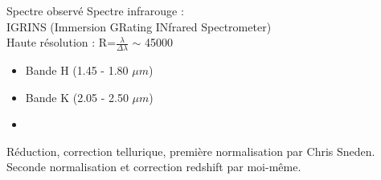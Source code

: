 \documentclass[10pt]{beamer}
\begin{document}
\begin{frame}[fragile]{Spectre observé}
             Spectre infrarouge : \\
             IGRINS (Immersion GRating INfrared Spectrometer) \\ 
             Haute résolution : R=$\frac{\lambda}{\Delta \lambda}$ $\sim$ 45000 \\
    					\begin{itemize}
    						\item Bande H (1.45 - 1.80 $\mu m$)
    						\item Bande K (2.05 - 2.50 $\mu m$)
    						\item[]
    					\end{itemize}
        \vfill
        Réduction, correction tellurique, première normalisation par Chris Sneden. \\
        \vfill
        Seconde normalisation et correction redshift par moi-même. \\
\end{frame}
\end{document}
